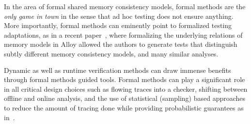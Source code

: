 In the area of formal shared memory consistency models, formal methods are the {\em only game in town} in the sense that ad hoc testing 
does not ensure anything.
%
More importantly, formal methods can eminently 
point to formalized testing adaptations, as
in a recent paper~\cite{DBLP:conf/popl/WickersonBSC17}, where formalizing the underlying relations
of memory models in Alloy
allowed the authors to generate tests that
distinguish subtly different 
memory consistency models, and many similar
analyses.

Dynamic as well
as runtime verification methods
can draw immense benefits through
formal methods guided tools.
%
Formal methods can play
a significant role in all critical 
design choices such as 
flowing traces into a checker,
shifting between offline and online
analysis, and the use of statistical (sampling)
based approaches to reduce the amount of
tracing done while providing
probabilistic guarantees as
in~\cite{DBLP:conf/asplos/BurckhardtKMN10}.


\fi

